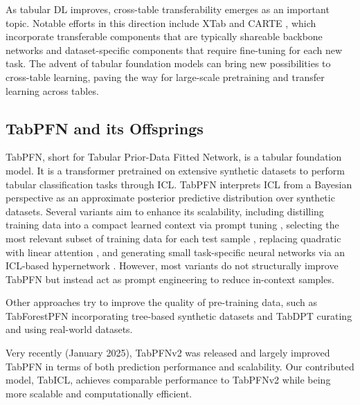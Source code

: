 As tabular DL improves, cross-table transferability emerges as an important topic. Notable efforts in this direction include XTab \cite{zhuXTabCrosstablePretraining2023} and CARTE \cite{kimCARTEPretrainingTransfer2024}, which incorporate transferable components that are typically shareable backbone networks and dataset-specific components that require fine-tuning for each new task. The advent of tabular foundation models can bring new possibilities to cross-table learning, paving the way for large-scale pretraining and transfer learning across tables.

\subsection{TabPFN and its Offsprings}
\label{ss:tabpfn_offsprings}

TabPFN, short for Tabular Prior-Data Fitted Network, is a tabular foundation model. It is a transformer pretrained on extensive synthetic datasets to perform tabular classification tasks through ICL. TabPFN interprets ICL from a Bayesian perspective as an approximate posterior predictive distribution over synthetic datasets. Several variants aim to enhance its scalability, including distilling training data into a compact learned context via prompt tuning \cite{maInContextDataDistillation2024,feuerTuneTablesContextOptimization2024}, selecting the most relevant subset of training data for each test sample \cite{xuMixtureInContextPrompters2024,thomasRetrievalFineTuningInContext2024,koshilLocalizationDataEmbedding}, replacing quadratic with linear attention \cite{zeng2024tabflex}, and generating small task-specific neural networks via an ICL-based hypernetwork \cite{mullerMotherNetFoundationalHypernetwork2023}. However, most variants do not structurally improve TabPFN but instead act as prompt engineering to reduce in-context samples.

Other approaches try to improve the quality of pre-training data, such as TabForestPFN \cite{breejenWhyInContextLearning2024} incorporating tree-based synthetic datasets and TabDPT \cite{maTabDPTScalingTabular2024} curating and using real-world datasets.

Very recently (January 2025), TabPFNv2 was released and largely improved TabPFN in terms of both prediction performance and scalability. Our contributed model, TabICL, achieves comparable performance to TabPFNv2 while being more scalable and computationally efficient.